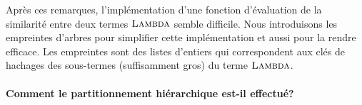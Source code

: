 Après ces remarques, l'implémentation d'une fonction d'évaluation de
la similarité entre deux termes $\textsc{Lambda}$ semble difficile. Nous introduisons
les empreintes d'arbres pour simplifier cette implémentation et aussi
pour la rendre efficace. Les empreintes sont des listes d'entiers qui
correspondent aux clés de hachages des sous-termes (suffisamment gros)
du terme $\textsc{Lambda}$.


\paragraph{Comment le partitionnement hiérarchique est-il effectué?}
